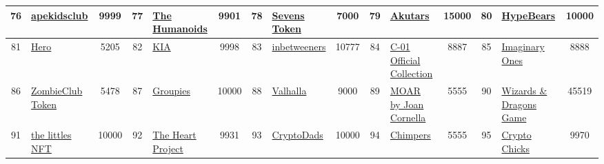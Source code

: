 \begin{table*}[]
{\begin{tabular}{|c|l|c|c|l|c|c|l|c|c|l|c|c|l|c|}
        76    & \href{http://www.apekidsclub.io}{apekidsclub}                                      & 9999              & 77    & \href{http://thehumanoids.com}{The Humanoids}                                                     & 9901              & 78    & \href{https://thesevensofficial.com/}{Sevens Token}                               & 7000              & 79    & \href{https://www.aku.world/}{Akutars}                                        & 15000             & 80    & \href{http://hypebears.io}{HypeBears}                                                     & 10000                                   \\ \hline
        81    & \href{https://raid.party/}{Hero}                                                   & 5205              & 82    & \href{https://koalaintelligence.agency}{KIA}                                                      & 9998              & 83    & \href{https://www.inbetweeners.io/}{inbetweeners}                                 & 10777             & 84    & \href{https://c-01nft.io/}{C-01 Official Collection}                          & 8887              & 85    & \href{https://imaginaryones.com}{Imaginary Ones}                                          & 8888                                    \\ \hline
        86    & \href{https://zombieclub.io/}{ZombieClub Token}                                    & 5478              & 87    & \href{http://os.peacevoid.world}{Groupies}                                                        & 10000             & 88    & \href{http://joinvalhalla.com}{Valhalla}                                          & 9000              & 89    & \href{https://joancornella.fwenclub.com/}{MOAR by Joan Cornella}              & 5555              & 90    & \href{https://wnd.game/}{Wizards \& Dragons Game}                                         & 45519                                   \\ \hline
        91    & \href{http://thelittles.io}{the littles NFT}                                       & 10000             & 92    & \href{http://heartnfts.io}{The Heart Project}                                                     & 9931              & 93    & \href{http://www.CryptoDadsNFT.com}{CryptoDads}                                   & 10000             & 94    & \href{https://www.chimpers.xyz/}{Chimpers}                                    & 5555              & 95    & \href{https://www.cryptochicks.app/}{Crypto Chicks}                                       & 9970                                    \\ \hline

\end{tabular}}
\end{table*}
